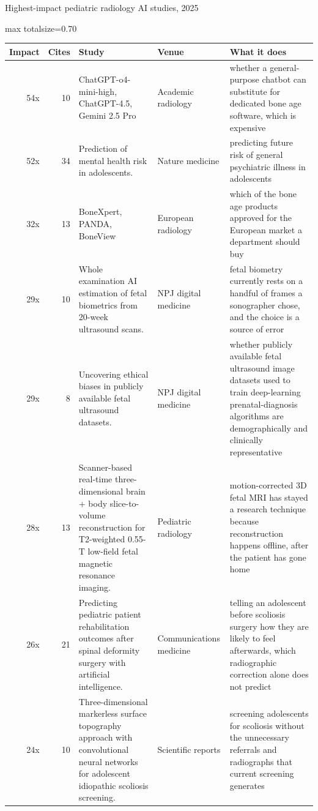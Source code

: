 \documentclass[aspectratio=169]{beamer}
\renewcommand{\arraystretch}{1.08}
\begin{document}
\begin{frame}[category=Journals/Preprints]{Highest-impact pediatric radiology AI studies, 2025}
\tiny
\begin{adjustbox}{max totalsize={\textwidth}{0.70\textheight}}
\renewcommand{\arraystretch}{1.2}
\begin{tabular}{|r|r|>{\raggedright\arraybackslash}p{}|>{\raggedright\arraybackslash}p{}|>{\raggedright\arraybackslash}p{}|}
\hline \textbf{Impact} & \textbf{Cites} & \textbf{Study} & \textbf{Venue} & \textbf{What it does} \\ \hline
54x & 10 & ChatGPT-o4-mini-high, ChatGPT-4.5, Gemini 2.5 Pro & Academic radiology & whether a general-purpose chatbot can substitute for dedicated bone age software, which is expensive \\ \hline
52x & 34 & Prediction of mental health risk in adolescents. & Nature medicine & predicting future risk of general psychiatric illness in adolescents \\ \hline
32x & 13 & BoneXpert, PANDA, BoneView & European radiology & which of the bone age products approved for the European market a department should buy \\ \hline
29x & 10 & Whole examination AI estimation of fetal biometrics from 20-week ultrasound scans. & NPJ digital medicine & fetal biometry currently rests on a handful of frames a sonographer chose, and the choice is a source of error \\ \hline
29x & 8 & Uncovering ethical biases in publicly available fetal ultrasound datasets. & NPJ digital medicine & whether publicly available fetal ultrasound image datasets used to train deep-learning prenatal-diagnosis algorithms are demographically and clinically representative \\ \hline
28x & 13 & Scanner-based real-time three-dimensional brain + body slice-to-volume reconstruction for T2-weighted 0.55-T low-field fetal magnetic resonance imaging. & Pediatric radiology & motion-corrected 3D fetal MRI has stayed a research technique because reconstruction happens offline, after the patient has gone home \\ \hline
26x & 21 & Predicting pediatric patient rehabilitation outcomes after spinal deformity surgery with artificial intelligence. & Communications medicine & telling an adolescent before scoliosis surgery how they are likely to feel afterwards, which radiographic correction alone does not predict \\ \hline
24x & 10 & Three-dimensional markerless surface topography approach with convolutional neural networks for adolescent idiopathic scoliosis screening. & Scientific reports & screening adolescents for scoliosis without the unnecessary referrals and radiographs that current screening generates \\ \hline

\end{tabular}
\end{adjustbox}
\end{frame}
\end{document}
